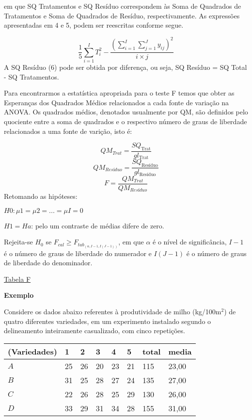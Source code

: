 \documentclass[
]{book}
\begin{document}
em que SQ Tratamentos e SQ Resíduo correspondem às Soma de Quadrados de Tratamentos e Soma de Quadrados de Resíduo, respectivamente.
As expressões apresentadas em 4 e 5, podem ser reescritas conforme segue.

\[\displaystyle{\frac{1}{5}\sum_{i=1}^I T_i^2 - \frac{\left(\sum_{i=1}^I\sum_{j=1}^Jy_{ij}\right)^2}{i\times j}}\]
A SQ Resíduo (6) pode ser obtida por diferença, ou seja,
SQ Resíduo = SQ Total - SQ Tratamentos.

Para encontrarmos a estatística apropriada para o teste F temos que obter as Esperanças dos Quadrados Médios relacionados a cada fonte de variação na ANOVA.
Os quadrados médios, denotados usualmente por QM, são definidos pelo quociente entre a soma de quadrados e o respectivo número de graus de liberdade relacionados a uma fonte de varição, isto é:

\[QM_{Trat} = \displaystyle{\frac{SQ_\text{Trat}}{gl_\text{Trat}}}\]
\[QM_{Resíduo} = \displaystyle{\frac{SQ_\text{Resíduo}}{gl_\text{Resíduo}}}\]
\[F = \displaystyle{\frac{QM_{Trat}}{QM_{Resíduo}}}\]
Retomando as hipóteses:

\(H0 : \mu1 = \mu2 = ... = \mu I = 0\)

\(H1 = Ha\): pelo um contraste de médias difere de zero.

Rejeita-se \(H_0\) se \(F_{cal} \geq F_{tab_{(\alpha, I-1, I(J-1))}}\), em que \(\alpha\) é o nível de significância, \(I-1\) é o número de graus de liberdade do numerador e \(I(J-1)\) é o número de graus de liberdade do denominador.

\href{https://docs.ufpr.br/~vayego/pedeefes/tab_sned.pdf}{Tabela F}

\textbf{Exemplo}

Considere os dados abaixo referentes à produtividade de milho (kg/100m\(^2\)) de quatro diferentes variedades, em um experimento instalado segundo o delineamento inteiramente casualizado, com cinco repetições.

\begin{longtable}[]{@{}llllllll@{}}
\toprule()
(Variedades) & 1 & 2 & 3 & 4 & 5 & total & media \\
\midrule()
\endhead
\(A\) & 25 & 26 & 20 & 23 & 21 & 115 & 23,00 \\
\(B\) & 31 & 25 & 28 & 27 & 24 & 135 & 27,00 \\
\(C\) & 22 & 26 & 28 & 25 & 29 & 130 & 26,00 \\
\(D\) & 33 & 29 & 31 & 34 & 28 & 155 & 31,00 \\
\bottomrule()
\end{longtable}
\end{document}
